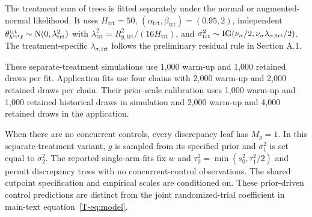 The treatment sum of trees is fitted separately under the normal or augmented-normal likelihood. It uses $H_{\mathrm{trt}}=50$, $(\alpha_{\mathrm{trt}},\beta_{\mathrm{trt}})=(0.95,2)$, independent $\theta^{\mathrm{trt}}_{h^{\mathrm{trt}}\ell}\sim\mathrm{N}(0,\lambda_{\mathrm{trt}}^2)$ with $\lambda_{\mathrm{trt}}^2=R_{y,\mathrm{trt}}^2/(16H_{\mathrm{trt}})$, and $\sigma_{\mathrm{trt}}^2\sim\operatorname{IG}(\nu_\sigma/2,\nu_\sigma\lambda_{\sigma,\mathrm{trt}}/2)$. The treatment-specific $\lambda_{\sigma,\mathrm{trt}}$ follows the preliminary residual rule in Section A.1.


These separate-treatment simulations use 1,000 warm-up and 1,000 retained draws per fit. Application fits use four chains with 2,000 warm-up and 2,000 retained draws per chain. Their prior-scale calibration uses 1,000 warm-up and 1,000 retained historical draws in simulation and 2,000 warm-up and 4,000 retained draws in the application.

When there are no concurrent controls, every discrepancy leaf has $M_g=1$. In this separate-treatment variant, $g$ is sampled from its specified prior and $\sigma_1^2$ is set equal to $\sigma_2^2$. The reported single-arm fits fix $w$ and $\tau_0^2=\min(s_0^2,\tau_1^2/2)$ and permit discrepancy trees with no concurrent-control observations. The shared cutpoint specification and empirical scales are conditioned on. These prior-driven control predictions are distinct from the joint randomized-trial coefficient in main-text equation~\eqref{T-eq:model}.

